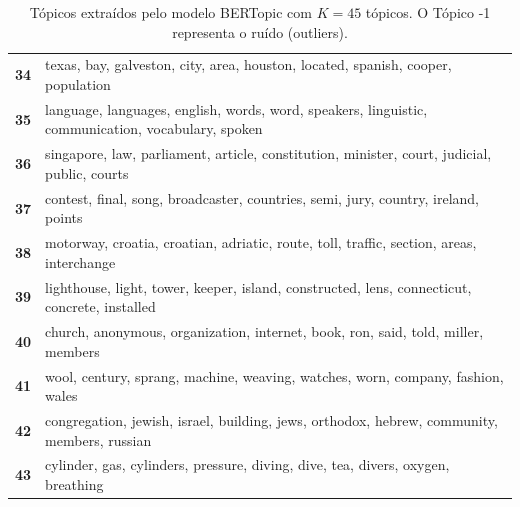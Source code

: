 \begin{table}[htpb]
\begin{tabularx}{\textwidth}{@{}l X@{}}
        \textbf{34} & texas, bay, galveston, city, area, houston, located, spanish, cooper, population \\
        \textbf{35} & language, languages, english, words, word, speakers, linguistic, communication, vocabulary, spoken \\
        \textbf{36} & singapore, law, parliament, article, constitution, minister, court, judicial, public, courts \\
        \textbf{37} & contest, final, song, broadcaster, countries, semi, jury, country, ireland, points \\
        \textbf{38} & motorway, croatia, croatian, adriatic, route, toll, traffic, section, areas, interchange \\
        \textbf{39} & lighthouse, light, tower, keeper, island, constructed, lens, connecticut, concrete, installed \\
        \textbf{40} & church, anonymous, organization, internet, book, ron, said, told, miller, members \\
        \textbf{41} & wool, century, sprang, machine, weaving, watches, worn, company, fashion, wales \\
        \textbf{42} & congregation, jewish, israel, building, jews, orthodox, hebrew, community, members, russian \\
        \textbf{43} & cylinder, gas, cylinders, pressure, diving, dive, tea, divers, oxygen, breathing \\
        \bottomrule
    \end{tabularx}
    \caption{Tópicos extraídos pelo modelo BERTopic com $K=45$ tópicos. O Tópico -1 representa o ruído (outliers).}
    \label{tab:topicos_bertopic_45}
\end{table}
